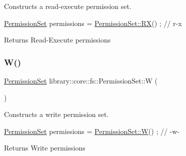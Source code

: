 Constructs a read-\/execute permission set. 


\begin{DoxyCode}
\hyperlink{classlibrary_1_1core_1_1fs_1_1_permission_set_a8a6eb39cc2a8bca92a657d065d3e36ba}{PermissionSet} permissions = \hyperlink{classlibrary_1_1core_1_1fs_1_1_permission_set_adb5417e6188ca697a21723613a60b690}{PermissionSet::RX}() ; \textcolor{comment}{// r-x}
\end{DoxyCode}


\begin{DoxyReturn}{Returns}
Read-\/\+Execute permissions 
\end{DoxyReturn}
\mbox{\label{classlibrary_1_1core_1_1fs_1_1_permission_set_a5c14c532f7b54be7b263e7ef54648bfb}} 
\subsubsection{\texorpdfstring{W()}{W()}}
{\footnotesize\ttfamily \hyperlink{classlibrary_1_1core_1_1fs_1_1_permission_set}{Permission\+Set} library\+::core\+::fs\+::\+Permission\+Set\+::W (\begin{DoxyParamCaption}{ }\end{DoxyParamCaption})\hspace{0.3cm}{\ttfamily [static]}}



Constructs a write permission set. 


\begin{DoxyCode}
\hyperlink{classlibrary_1_1core_1_1fs_1_1_permission_set_a8a6eb39cc2a8bca92a657d065d3e36ba}{PermissionSet} permissions = \hyperlink{classlibrary_1_1core_1_1fs_1_1_permission_set_a5c14c532f7b54be7b263e7ef54648bfb}{PermissionSet::W}() ; \textcolor{comment}{// -w-}
\end{DoxyCode}


\begin{DoxyReturn}{Returns}
Write permissions 
\end{DoxyReturn}
\mbox{\label{classlibrary_1_1core_1_1fs_1_1_permission_set_a255d93c873ab812d7e6827de03de63e9}} 
